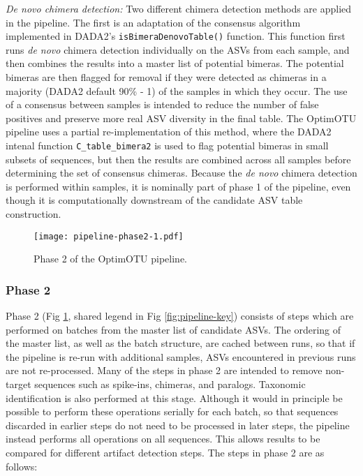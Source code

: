 \documentclass[
]{article}
\begin{document}
\emph{De novo chimera detection:}
Two different chimera detection methods are applied in the pipeline.
The first is an adaptation of the consensus algorithm implemented in DADA2's \texttt{isBimeraDenovoTable()} function.
This function first runs \emph{de novo} chimera detection individually on the ASVs from each sample, and then combines the results into a master list of potential bimeras.
The potential bimeras are then flagged for removal if they were detected as chimeras in a majority (DADA2 default 90\% - 1) of the samples in which they occur.
The use of a consensus between samples is intended to reduce the number of false positives and preserve more real ASV diversity in the final table.
The OptimOTU pipeline uses a partial re-implementation of this method, where the DADA2 intenal function \texttt{C\_table\_bimera2} is used to flag potential bimeras in small subsets of sequences, but then the results are combined across all samples before determining the set of consensus chimeras.
Because the \emph{de novo} chimera detection is performed within samples, it is nominally part of phase 1 of the pipeline, even though it is computationally downstream of the candidate ASV table construction.

\begin{figure}
\centering
\texttt{[image: pipeline-phase2-1.pdf]}
\caption{\label{fig:pipeline-phase2}Phase 2 of the OptimOTU pipeline.}
\end{figure}

\subsubsection{Phase 2}\label{phase-2}

Phase 2 (Fig \ref{fig:pipeline-phase2}, shared legend in Fig \ref{fig:pipeline-key}) consists of steps which are performed on batches from the master list of candidate ASVs.
The ordering of the master list, as well as the batch structure, are cached between runs, so that if the pipeline is re-run with additional samples, ASVs encountered in previous runs are not re-processed.
Many of the steps in phase 2 are intended to remove non-target sequences such as spike-ins, chimeras, and paralogs.
Taxonomic identification is also performed at this stage.
Although it would in principle be possible to perform these operations serially for each batch, so that sequences discarded in earlier steps do not need to be processed in later steps, the pipeline instead performs all operations on all sequences.
This allows results to be compared for different artifact detection steps.
The steps in phase 2 are as follows:
\end{document}
